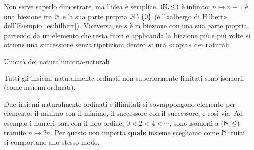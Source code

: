 \begin{spiegazione}
    Non serve saperlo dimostrare, ma l'idea è semplice. $(\mathbb{N}, \leq)$ è infinito: $n \mapsto n + 1$ è una biezione tra $\mathbb{N}$ e la sua parte propria $\mathbb{N} \setminus \{0\}$ (è
    l'«albergo di Hilbert» dell'Esempio~\ref{es:hilbert}). Viceversa, se $s$ è in biezione con una sua parte propria, partendo da un elemento che resta fuori e
    applicando la biezione più e più volte si ottiene una successione senza ripetizioni dentro $s$: una «copia» dei naturali.
\end{spiegazione}


\begin{concetto}
\begin{Teorema}{Unicità dei naturali}{unicita-naturali}
    \begin{prerequisiti}
    \end{prerequisiti}
    \senzadim
    Tutti gli insiemi naturalmente ordinati non superiormente limitati sono isomorfi (come insiemi ordinati).
\end{Teorema}
\end{concetto}

\begin{spiegazione}
    Due insiemi naturalmente ordinati e illimitati si sovrappongono elemento per elemento: il minimo con il minimo, il successore con il successore, e così via.
    Ad esempio i numeri pari con il loro ordine, $0 < 2 < 4 < \cdots$, sono isomorfi a $(\mathbb{N}, \leq)$ tramite $n \mapsto 2n$. Per questo non importa \textbf{quale}
    insieme scegliamo come $\mathbb{N}$: tutti si comportano allo stesso modo.
\end{spiegazione}



